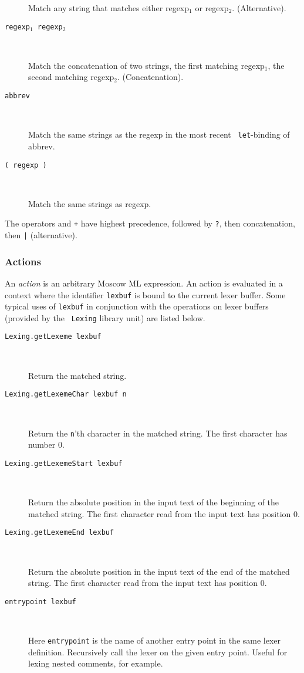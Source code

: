 \documentclass[fleqn,a4paper]{article}
\begin{document}
\begin{description}
  Match any string that matches either regexp$_1$ or regexp$_2$.
  (Alternative).

\item[{\tt {\rm regexp}$_1$ {\rm regexp}$_2$}]\mbox{ }

  Match the concatenation of two strings, the first matching
  regexp$_1$, the second matching regexp$_2$.  (Concatenation).

\item[{\tt {\rm abbrev} }]\mbox{ }

  Match the same strings as the regexp in the most recent {\tt
    let}-binding of abbrev.

\item[{\tt ( {\rm regexp} )}]\mbox{ }

  Match the same strings as regexp.

\end{description}

\noindent The operators {\tt *} and {\tt +} have highest precedence,
followed by {\tt ?}, then concatenation, then {\tt |} (alternative).

\newpage
\subsubsection{Actions}

An \emph{action} is an arbitrary Moscow ML expression.  An action is
evaluated in a context where the identifier {\tt lexbuf} is bound to
the current lexer buffer.  Some typical uses of {\tt lexbuf} in
conjunction with the operations on lexer buffers (provided by the {\tt
  Lexing} library unit) are listed below.

\begin{description}
\item[{\tt Lexing.getLexeme lexbuf}]\mbox{ }

  Return the matched string.

\item[{\tt Lexing.getLexemeChar lexbuf n}]\mbox{ }
 
  Return the {\tt n}'th character in the matched string.  The first
  character has number 0.

\item[{\tt Lexing.getLexemeStart lexbuf}]\mbox{ }

  Return the absolute position in the input text of the beginning of
  the matched string.  The first character read from the input text
  has position 0.

\item[{\tt Lexing.getLexemeEnd lexbuf}]\mbox{ }

  Return the absolute position in the input text of the end of the
  matched string.  The first character read from the input text has
  position 0.

\item[{\tt entrypoint lexbuf}]\mbox{ }

  Here {\tt entrypoint} is the name of another entry point in the same
  lexer definition.  Recursively call the lexer on the given entry
  point.  Useful for lexing nested comments, for example.
\end{description}
\end{document}
